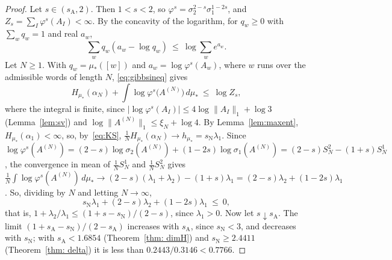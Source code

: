 \documentclass[11pt]{amsart}
\theoremstyle{definition}
\theoremstyle{remark}
\newcommand{\sN}{s_{\mathrm N}}
\newcommand{\sA}{s_{\mathrm A}}
\newcommand{\abs}[1]{\lvert #1\rvert}
\newcommand{\norm}[1]{\lVert #1\rVert}
\begin{document}
\begin{proof}
    Let $s\in(\sA,2)$. 
    Then $1<s<2$, so $\varphi^s=\sigma_2^{2-s}\sigma_1^{1-2s}$, and $Z_s=\sum_I\varphi^s(A_I)<\infty$. By the concavity of the logarithm, for $q_w\ge0$ with $\sum_wq_w=1$ and real $a_w$,
\begin{equation}\label{eq:gibbsineq}
  \sum_wq_w(a_w-\log q_w)\ \le\ \log\sum_we^{a_w}.
\end{equation}
    Let $N\ge1$. With $q_w=\mu_*([w])$ and $a_w=\log\varphi^s(A_w)$, where $w$ runs over the admissible words of length $N$, \eqref{eq:gibbsineq} gives
\[
  H_{\mu_*}(\alpha_N)+\int\log\varphi^s\bigl(A^{(N)}\bigr)\,d\mu_*\ \le\ \log Z_s ,
\]
    where the integral is finite, since $\abs{\log\varphi^s(A_I)}\le4\log\norm{A_I}_1+\log3$ (Lemma~\ref{lem:sv}) and $\log\norm{A^{(N)}}_1\le\xi_N+\log4$. By Lemma~\ref{lem:maxent}, $H_{\mu_*}(\alpha_1)<\infty$, so, by~\eqref{eq:KS}, $\frac1NH_{\mu_*}(\alpha_N)\to h_{\mu_*}=\sN\lambda_1$. 
    Since $\log\varphi^s(A^{(N)})=(2-s)\log\sigma_2(A^{(N)})+(1-2s)\log\sigma_1(A^{(N)})=(2-s)S^2_N-(1+s)S^1_N$, the convergence in mean of $\frac1NS^1_N$ and $\frac1NS^2_N$ gives $\frac1N\int\log\varphi^s(A^{(N)})\,d\mu_*\to(2-s)(\lambda_1+\lambda_2)-(1+s)\lambda_1=(2-s)\lambda_2+(1-2s)\lambda_1$. 
    So, dividing by $N$ and letting $N\to\infty$,
\[
  \sN\lambda_1+(2-s)\lambda_2+(1-2s)\lambda_1\ \le\ 0 ,
\]
    that is, $1+\lambda_2/\lambda_1\le(1+s-\sN)/(2-s)$, since $\lambda_1>0$. 
    Now let $s\downarrow\sA$. 
    The limit $(1+\sA-\sN)/(2-\sA)$ increases with $\sA$, since $\sN<3$, and decreases with $\sN$; with $\sA<1.6854$ (Theorem~\ref{thm: dimH}) and $\sN\ge2.4411$ (Theorem~\ref{thm: delta}) it is less than $0.2443/0.3146<0.7766$.
\end{proof}
\end{document}
